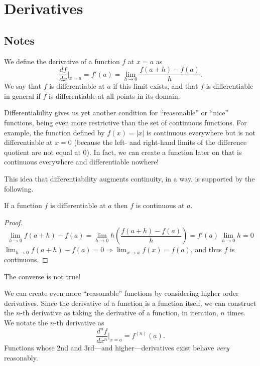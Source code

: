\section{Derivatives}

\subsection{Notes}
\begin{definition}
We define the derivative of a function $f$ at $x = a$ as
\[ \frac{df}{dx} \Big |_{x=a} = f'(a) = \lim_{h \rightarrow 0} \frac{f(a + h) - f(a)}{h}. \]
We say that $f$ is differentiable at $a$ if this limit exists, and that $f$ is differentiable in general if $f$ is differentiable at all points in its domain.
\end{definition}

Differentiability gives us yet another condition for ``reasonable'' or ``nice'' functions, being even more restrictive than the set of continuous functions. For example, the function defined by $f(x) = |x|$ is continuous everywhere but is not differentiable at $x = 0$ (because the left- and right-hand limits of the difference quotient are not equal at 0). In fact, we can create a function later on that is continuous everywhere and differentiable nowhere! 

This idea that differentiability augments continuity, in a way, is supported by the following.

\begin{theorem} \label{difimplcon}
If a function $f$ is differentiable at $a$ then $f$ is continuous at $a$. 

\begin{proof}
\[ \lim_{h \rightarrow 0} f(a + h) - f(a) = \lim_{h \rightarrow 0} h\left(\frac{f(a + h) - f(a)}{h}\right) = f'(a) \, \lim_{h \rightarrow 0} h = 0 \]
$\lim_{h \rightarrow 0} f(a + h) - f(a) = 0 \Rightarrow \lim_{x \to a} f(x) = f(a)$, and thus $f$ is continuous.
\end{proof}
\end{theorem}

\begin{remark}
The converse is not true!
\end{remark}

We can create even more ``reasonable'' functions by considering higher order derivatives. Since the derivative of a function is a function itself, we can construct the $n$-th derivative as taking the derivative of a function, in iteration, $n$ times. We notate the $n$-th derivative as 
\[ \frac{d^nf}{dx^n} \Big |_{x=a} = f^{(n)}(a). \]
Functions whose 2nd and 3rd---and higher---derivatives exist behave \textit{very} reasonably.

